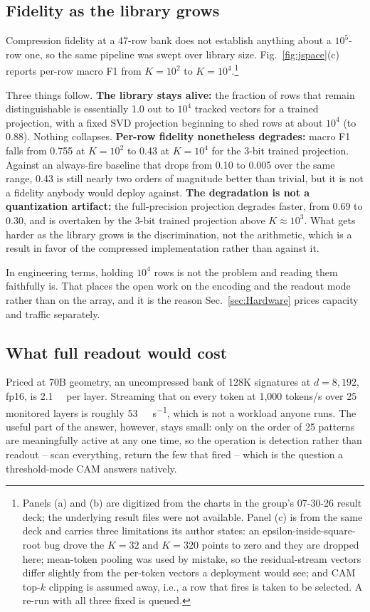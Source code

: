 \documentclass[conference]{IEEEtran}
\newcommand{\cam}{{CAM}\xspace}
\begin{document}
\subsection{Fidelity as the library grows}
\label{subsec:JspaceScaling}
Compression fidelity at a 47-row bank does not establish anything about a
$10^{5}$-row one, so the same pipeline was swept over library size.
Fig.~\ref{fig:jspace}(c) reports per-row macro F1 from $K=10^{2}$ to
$K=10^{4}$.\footnote{Panels (a) and (b) are digitized from the charts in
the group's 07-30-26 result deck; the underlying result files were not
available. Panel (c) is from the same deck and carries three limitations
its author states: an epsilon-inside-square-root bug drove the $K=32$ and
$K=320$ points to zero and they are dropped here; mean-token pooling was
used by mistake, so the residual-stream vectors differ slightly from the
per-token vectors a deployment would see; and \cam top-$k$ clipping is
assumed away, i.e., a row that fires is taken to be selected. A re-run
with all three fixed is queued.}

Three things follow. \textbf{The library stays alive:} the fraction of
rows that remain distinguishable is essentially 1.0 out to $10^{4}$
tracked vectors for a trained projection, with a fixed SVD projection
beginning to shed rows at about $10^{4}$ (to 0.88). Nothing collapses.
\textbf{Per-row fidelity nonetheless degrades:} macro F1 falls from 0.755
at $K=10^{2}$ to 0.43 at $K=10^{4}$ for the 3-bit trained projection.
Against an always-fire baseline that drops from 0.10 to 0.005 over the
same range, 0.43 is still nearly two orders of magnitude better than
trivial, but it is not a fidelity anybody would deploy against.
\textbf{The degradation is not a quantization artifact:} the
full-precision projection degrades faster, from 0.69 to 0.30, and is
overtaken by the 3-bit trained projection above $K\approx10^{3}$. What
gets harder as the library grows is the discrimination, not the
arithmetic, which is a result in favor of the compressed
implementation rather than against it.

In engineering terms, holding $10^{4}$ rows is not the problem and
reading them faithfully is. That places the open work on the encoding
and the readout mode rather than on the array, and it is the reason
Sec.~\ref{sec:Hardware} prices capacity and traffic separately.

\subsection{What full readout would cost}
\label{subsec:ReadoutCost}
Priced at 70B geometry, an uncompressed bank of 128K signatures at
$d=8{,}192$, fp16, is \qty{2.1}{\giga\byte} per layer. Streaming that on
every token at 1{,}000 tokens/s over 25 monitored layers is roughly
\qty{53}{\tera\byte\per\second}, which is not a workload anyone runs. The
useful part of the answer, however, stays small: only on the order of 25
patterns are meaningfully active at any one time, so the operation is
detection rather than readout -- scan everything, return the few that
fired -- which is the question a threshold-mode \cam answers natively.
\end{document}
